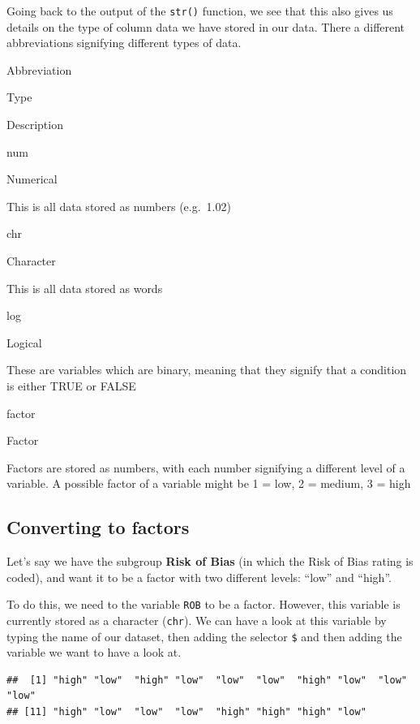 \documentclass[]{book}
\newenvironment{Shaded}{\begin{snugshade}}{\end{snugshade}}
\newcommand{\NormalTok}[1]{#1}
\newcommand{\OperatorTok}[1]{\textcolor[rgb]{0.81,0.36,0.00}{\textbf{#1}}}
\begin{document}
Going back to the output of the \texttt{str()} function, we see that this also gives us details on the type of column data we have stored in our data. There a different abbreviations signifying different types of data.

Abbreviation

Type

Description

num

Numerical

This is all data stored as numbers (e.g.~1.02)

chr

Character

This is all data stored as words

log

Logical

These are variables which are binary, meaning that they signify that a condition is either TRUE or FALSE

factor

Factor

Factors are stored as numbers, with each number signifying a different level of a variable. A possible factor of a variable might be 1 = low, 2 = medium, 3 = high

\hypertarget{convertfactors}{%
\subsection{Converting to factors}\label{convertfactors}}

Let's say we have the subgroup \textbf{Risk of Bias} (in which the Risk of Bias rating is coded), and want it to be a factor with two different levels: ``low'' and ``high''.

To do this, we need to the variable \texttt{ROB} to be a factor. However, this variable is currently stored as a character (\texttt{chr}). We can have a look at this variable by typing the name of our dataset, then adding the selector \texttt{\$} and then adding the variable we want to have a look at.

\begin{Shaded}
\end{Shaded}

\begin{verbatim}
##  [1] "high" "low"  "high" "low"  "low"  "low"  "high" "low"  "low"  "low" 
## [11] "high" "low"  "low"  "low"  "high" "high" "high" "low"
\end{verbatim}
\end{document}
